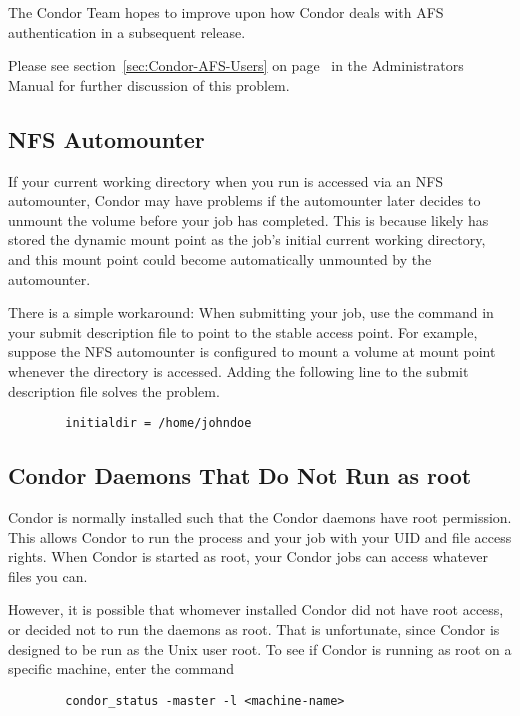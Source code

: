 The Condor Team hopes to improve upon
how Condor deals with AFS authentication
in a subsequent release.

Please see section~\ref{sec:Condor-AFS-Users} on
page~\pageref{sec:Condor-AFS-Users} in the Administrators Manual for
further discussion of this problem.

\subsection{NFS Automounter}

If your current working directory when you run 
is accessed via an NFS automounter, Condor may have problems if the
automounter later decides to unmount the volume before your job has
completed.
This is because  likely has stored the
dynamic mount point as the job's initial current working directory, and
this mount point could become automatically unmounted by the
automounter.

There is a simple workaround: When submitting your job, use the 
 command in your submit description file to point to
the stable access point.
For example,
suppose the NFS automounter is configured to mount a volume at mount point
whenever the directory  is accessed.
Adding the following line to the
submit description file solves the problem.
\begin{verbatim}
        initialdir = /home/johndoe
\end{verbatim}

\subsection{Condor Daemons That Do Not Run as root}

Condor is normally installed such that the Condor daemons have root
permission.
This allows Condor to run the  
process and
your job with your UID and file access rights.
When Condor
is started as root, your Condor jobs can access whatever files you can.

However, it is possible that whomever installed Condor 
did not have root access, or
decided not to run the daemons as root.
That is unfortunate,
since Condor is designed to be run as the Unix user root.
To see if Condor is
running as root on a specific machine, enter the command
\begin{verbatim}
        condor_status -master -l <machine-name>
\end{verbatim}

